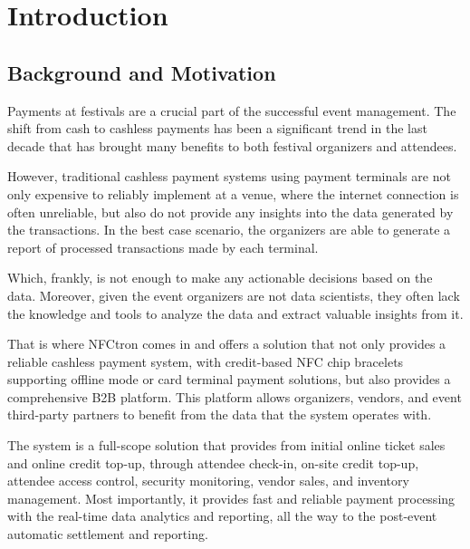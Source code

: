 \chapter*{Introduction}
\label{ch:introduction}


\section*{Background and Motivation}
\label{sec:introduction-background-motivation}
Payments at festivals are a crucial part of the successful event management.
The shift from cash to cashless payments has been a significant trend in the last decade that has brought many benefits to both festival organizers and attendees\cite{bl_en_waarom_festivals_overstappen_op_cashless_betalen}.

However, traditional cashless payment systems using payment terminals are not only expensive to reliably implement at a venue, where the internet connection is often unreliable, but also do not provide any insights into the data generated by the transactions.
In the best case scenario, the organizers are able to generate a report of processed transactions made by each terminal.

Which, frankly, is not enough to make any actionable decisions based on the data.
Moreover, given the event organizers are not data scientists, they often lack the knowledge and tools to analyze the data and extract valuable insights from it.

That is where NFCtron comes in and offers a solution that not only provides a reliable cashless payment system, with credit-based NFC chip bracelets supporting offline mode or card terminal payment solutions, but also provides a comprehensive B2B platform.
This platform allows organizers, vendors, and event third-party partners to benefit from the data that the system operates with\cite{nfctron_en_company}.

The system is a full-scope solution that provides from initial online ticket sales and online credit top-up, through attendee check-in, on-site credit top-up, attendee access control, security monitoring, vendor sales, and inventory management.
Most importantly, it provides fast and reliable payment processing with the real-time data analytics and reporting, all the way to the post-event automatic settlement and reporting.

